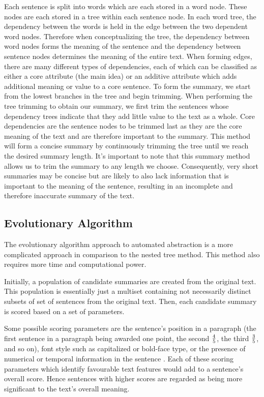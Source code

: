 Each sentence is split into words which are each stored in a word node. These nodes are each stored in a tree within each sentence node. In each word tree, the dependency between the words is held in the edge between the two dependent word nodes. Therefore when conceptualizing the tree, the dependency between word nodes forms the meaning of the sentence and the dependency between sentence nodes determines the meaning of the entire text. When forming edges, there are many different types of dependencies, each of which can be classified as either a core attribute (\ie the main idea) or an additive attribute which adds additional meaning or value to a core sentence. To form the summary, we start from the lowest branches in the tree and begin trimming. When performing the tree trimming to obtain our summary, we first trim the sentences whose dependency trees indicate that they add little value to the text as a whole. Core dependencies are the sentence nodes to be trimmed last as they are the core meaning of the text and are therefore important to the summary. This method will form a concise summary by continuously trimming the tree until we reach the desired summary length. It's important to note that this summary method allows us to trim the summary to any length we choose. Consequently, very short summaries may be concise but are likely to also lack information that is important to the meaning of the sentence, resulting in an incomplete and therefore inaccurate summary of the text. 

\subsection{Evolutionary Algorithm}
The evolutionary algorithm approach to automated abstraction is a more complicated approach in comparison to the nested tree method. This method also requires more time and computational power.

Initially, a population of candidate summaries are created from the original text. This population is essentially just a multiset containing not necessarily distinct subsets of set of sentences from the original text. Then, each candidate summary is scored based on a set of parameters.

Some possible scoring parameters are the sentence's position in a paragraph (the first sentence in a paragraph being awarded one point, the second $4 \over 5$, the third $3\over 5$, and so on), font style such as capitalized or bold-face type, or the presence of numerical or temporal information in the sentence \cite{art1}. Each of these scoring parameters which identify favourable text features would add to a sentence's overall score. Hence sentences with higher scores are regarded as being more significant to the text's overall meaning.


